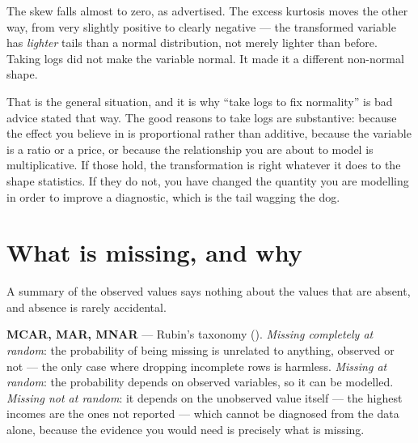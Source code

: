 \documentclass[
  letterpaper,
  10pt,
  twoside,
  openright,
  numbers=noenddot,
  chapterprefix=true]{scrbook}
\begin{document}
The skew falls almost to zero, as advertised. The excess kurtosis moves
the other way, from very slightly positive to clearly negative --- the
transformed variable has \emph{lighter} tails than a normal
distribution, not merely lighter than before. Taking logs did not make
the variable normal. It made it a different non-normal shape.

That is the general situation, and it is why ``take logs to fix
normality'' is bad advice stated that way. The good reasons to take logs
are substantive: because the effect you believe in is proportional
rather than additive, because the variable is a ratio or a price, or
because the relationship you are about to model is multiplicative. If
those hold, the transformation is right whatever it does to the shape
statistics. If they do not, you have changed the quantity you are
modelling in order to improve a diagnostic, which is the tail wagging
the dog.

\section{What is missing, and why}\label{what-is-missing-and-why}

A summary of the observed values says nothing about the values that are
absent, and absence is rarely accidental.

\begin{qmibdefinition}

{\textbf{MCAR, MAR, MNAR}} --- Rubin's taxonomy
(). \emph{Missing
completely at random}: the probability of being missing is unrelated to
anything, observed or not --- the only case where dropping incomplete
rows is harmless. \emph{Missing at random}: the probability depends on
observed variables, so it can be modelled. \emph{Missing not at random}:
it depends on the unobserved value itself --- the highest incomes are
the ones not reported --- which cannot be diagnosed from the data alone,
because the evidence you would need is precisely what is missing.

\end{qmibdefinition}
\end{document}
